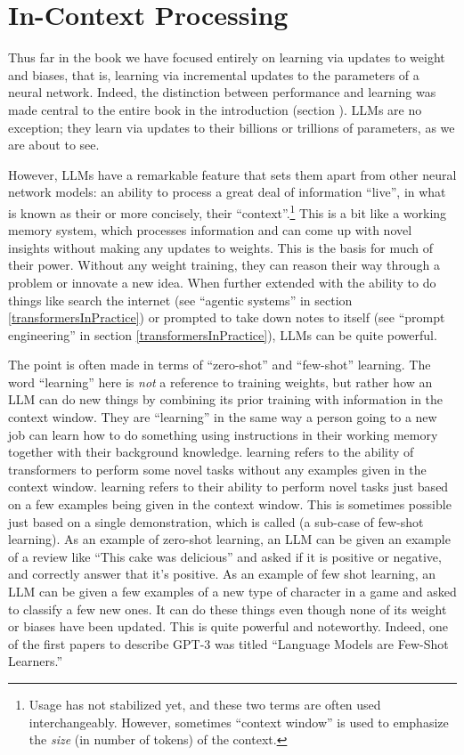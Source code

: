 \section{In-Context Processing}\label{inContext}

Thus far in the book we have focused entirely on learning via updates to weight
and biases, that is, learning via incremental updates to the parameters of a neural
network. Indeed, the distinction between performance and learning was made
central to the entire book in the introduction (section
). LLMs are no exception; they learn via updates to their billions or trillions of
parameters, as we are about to see.

However, LLMs have a remarkable feature that sets them apart from other neural
network models: an ability to process a great deal of information ``live'', in
what is known as their  or more concisely, their ``context''.\footnote{Usage has not stabilized yet, and these two terms are often used interchangeably. However, sometimes ``context window'' is used to emphasize the \emph{size} (in number of tokens) of the context.} This is a bit like a working memory system, which processes information and can come up with novel insights without making any updates to weights. This is the basis for much of their power. Without any weight training, they
can reason their way through a problem or innovate a new idea. When further
extended with the ability to do things like search the internet (see ``agentic
systems'' in section \ref{transformersInPractice}) or prompted to take down
notes to itself (see ``prompt engineering'' in section
\ref{transformersInPractice}), LLMs can be quite powerful.

The point is often made in terms of ``zero-shot'' and ``few-shot''
learning. The word ``learning'' here is \emph{not} a reference to training weights, but rather how an LLM can do new things by combining its prior training with information in the context window.  They are ``learning'' in the same way  a person going to a new job can learn how to do something using instructions in their working memory together with their background knowledge.  learning refers to the ability of transformers
to perform some novel tasks without any examples given in the context window. 
learning refers to their ability to perform novel tasks just based on a few examples being given in the context window. This is sometimes possible just based on a single demonstration, which is called  (a sub-case of few-shot learning).  As an example of zero-shot learning, an LLM can be given an example of a review like ``This cake was delicious'' and asked if it is positive or
negative, and correctly answer that it's positive. As an example of few shot learning, an LLM can be given a few examples of a new type of character in a game and asked to classify a few new ones. It can do these things
even though none of its weight or biases have been updated. This is quite powerful and
noteworthy. Indeed, one of the first papers to describe GPT-3 was titled ``Language
Models are Few-Shot Learners.''

